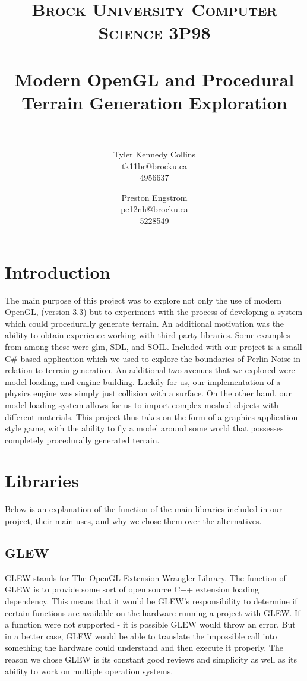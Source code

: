 \documentclass[paper=a4, fontsize=11pt]{scrartcl}
\title{
		\usefont{OT1}{bch}{b}{n}
		\normalfont \normalsize \textsc{Brock University Computer Science 3P98} \\ [25pt]
		\horrule{0.5pt} \\[0.4cm]
		\huge Modern OpenGL and Procedural Terrain Generation Exploration \\
		\horrule{2pt} \\[0.5cm]
}
\author{
		\normalfont 								\normalsize
        Tyler Kennedy Collins\\[-3pt]				\normalsize
        tk11br@brocku.ca\\[-3pt]					\normalsize
        4956637\\									\normalsize
        \and
        Preston Engstrom\\[-3pt]					\normalsize
        pe12nh@brocku.ca\\[-3pt]					\normalsize
        5228549\\									\normalsize
}
\date{}
\numberwithin{equation}{section}		%
\numberwithin{figure}{section}			%
\numberwithin{table}{section}				%
\begin{document}
\maketitle
\section{Introduction}
The main purpose of this project was to explore not only the use of modern OpenGL, (version 3.3) but to experiment with the process of developing a system which could procedurally generate terrain. An additional motivation was the ability to obtain experience working with third party libraries. Some examples from among these were glm, SDL, and SOIL. Included with our project is a small C\# based application which we used to explore the boundaries of Perlin Noise in relation to terrain generation. An additional two avenues that we explored were model loading, and engine building. Luckily for us, our implementation of a physics engine was simply just collision with a surface. On the other hand, our model loading system allows for us to import complex meshed objects with different materials. This project thus takes on the form of a graphics application style game, with the ability to fly a model around some world that possesses completely procedurally generated terrain.

\section{Libraries}
Below is an explanation of the function of the main libraries included in our project, their main uses, and why we chose them over the alternatives.
\subsection{GLEW}
GLEW stands for The OpenGL Extension Wrangler Library. The function of GLEW is to provide some sort of open source C++ extension loading dependency. This means that it would be GLEW's responsibility to determine if certain functions are available on the hardware running a project with GLEW. If a function were not supported - it is possible GLEW would throw an error. But in a better case, GLEW would be able to translate the impossible call into something the hardware could understand and then execute it properly. The reason we chose GLEW is its constant good reviews and simplicity as well as its ability to work on multiple operation systems.
\end{document}
